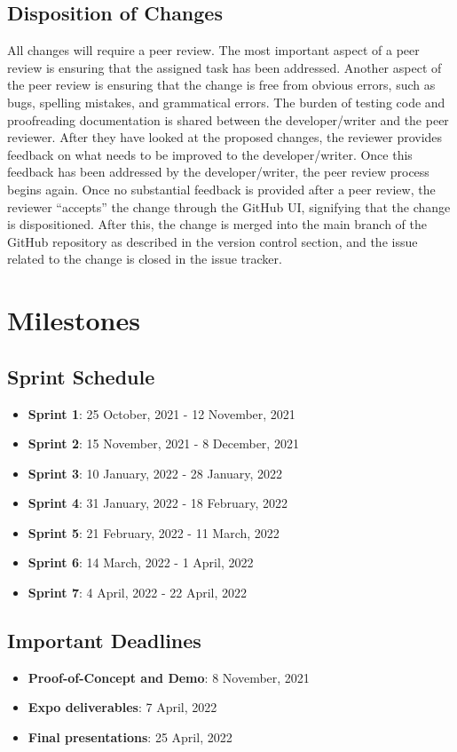\documentclass[fullpage]{article}
\begin{document}
\subsection{Disposition of Changes}
All changes will require a peer review. The most important aspect of a peer review is ensuring that the assigned task has been addressed. Another aspect of the peer review is ensuring that the change is free from obvious errors, such as bugs, spelling mistakes, and grammatical errors. The burden of testing code and proofreading documentation is shared between the developer/writer and the peer reviewer. After they have looked at the proposed changes, the reviewer provides feedback on what needs to be improved to the developer/writer. Once this feedback has been addressed by the developer/writer, the peer review process begins again. Once no substantial feedback is provided after a peer review, the reviewer “accepts” the change through the GitHub UI, signifying that the change is dispositioned. After this, the change is merged into the main branch of the GitHub repository as described in the version control section, and the issue related to the change is closed in the issue tracker.


\section{Milestones}

\subsection{Sprint Schedule}
\begin{itemize}
    \item \textbf{Sprint 1}: 25 October, 2021 - 12 November, 2021
    \item \textbf{Sprint 2}: 15 November, 2021 - 8 December, 2021
    \item \textbf{Sprint 3}: 10 January, 2022 - 28 January, 2022
    \item \textbf{Sprint 4}: 31 January, 2022 - 18 February, 2022
    \item \textbf{Sprint 5}: 21 February, 2022 - 11 March, 2022
    \item \textbf{Sprint 6}: 14 March, 2022 - 1 April, 2022
    \item \textbf{Sprint 7}: 4 April, 2022 - 22 April, 2022
\end{itemize}

\subsection{Important Deadlines}
\begin{itemize}
    \item \textbf{Proof-of-Concept and Demo}: 8 November, 2021
    \item \textbf{Expo deliverables}: 7 April, 2022
    \item \textbf{Final presentations}: 25 April, 2022
\end{itemize}
\end{document}
